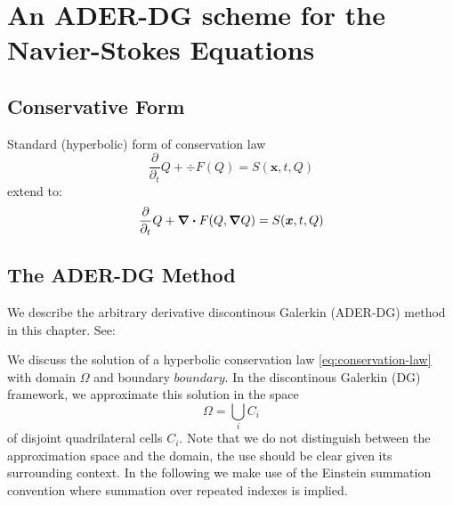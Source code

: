 \newcommand{\Qrho}{\rho}
\newcommand{\Qj}{\rho \bm{v}}
\newcommand{\Qv}{\bm{v}}
\newcommand{\QE}{\rho E}
\newcommand{\potT}{\theta}
\newcommand{\backgroundPotT}{\overline{\theta}}
\newcommand{\pertubationPotT}{\theta'}
\newcommand{\stressT}{\bm{\sigma}}
\newcommand{\pressure}{p}
\newcommand{\maxConvEigen}{\vert \lambda_c^{\text{max}} \vert}
\newcommand{\maxViscEigen}{\vert \lambda_v^{\text{max}} \vert}
\newcommand{\Riemann}{\operatorname{Riemann}}

\newcommand{\domain}{\Omega}
\newcommand{\broken}{\domain}
\newcommand{\cell}[1][i]{C_{#1}}
\newcommand{\boundary}{\partial \domain}
\newcommand{\sbasis}[1]{\Phi_{#1}}
\newcommand{\testfunction}[1]{\Phi_{#1}}
\newcommand{\normal}{\bm{n}}
\newcommand{\source}{\bm{S}}

\chapter{An ADER-DG scheme for the Navier-Stokes Equations}
\section{Conservative Form}
Standard (hyperbolic) form of conservation law
\begin{equation}
  \label{eq:conservation-law}
 \frac{\partial}{\partial_t}  Q + \div F(Q) = S(\bm{x}, t, Q)
\end{equation}
extend to:
\begin{equation}
  \label{eq:conservation-law-gradient}
 \frac{\partial}{\partial_t}  Q + \div F(Q, \grad Q) = S(\bm{x}, t, Q)
\end{equation}

\section{The ADER-DG Method}
\label{sec:ader-dg}
We describe the arbitrary derivative discontinous Galerkin (ADER-DG) method in this chapter.
See: \cite{dumbser2018efficient}

We discuss the solution of a hyperbolic conservation law \cref{eq:conservation-law} with domain $\domain$ and boundary $boundary$.
In the discontinous Galerkin (DG) framework, we approximate this solution in the space
\begin{equation}
  \label{eq:dg-space}
  \broken = \bigcup_i \cell
\end{equation}
of disjoint quadrilateral cells $\cell$.
Note that we do not distinguish between the approximation space and the domain, the use should be clear given its surrounding context.
In the following we make use of the Einstein summation convention where summation over repeated indexes is implied.

